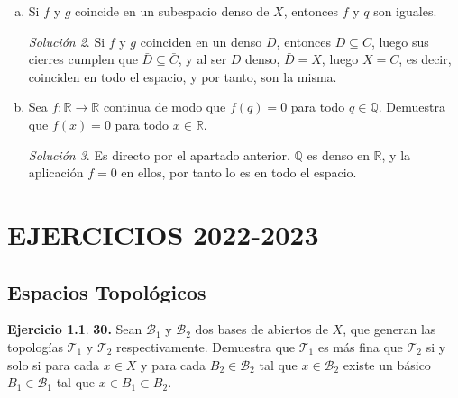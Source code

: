 \documentclass[12pt,twoside]{report}
\newcommand\mc[1]{\mathcal{#1}}
\theoremstyle{azul}
\theoremstyle{azul2}
\theoremstyle{plain}
\theoremstyle{definition}
\newtheorem*{ejer}{Ejercicio}
\theoremstyle{remark}
\newtheorem*{sol}{Solución}
\begin{document}
\begin{enumerate}
\begin{enumerate}[a)]
\begin{sol}
    Supongamos que existe $z \in f^{-1}(U) \cap g^{-1}(V) \cap C$, en cuyo caso, $f(z) \in U, g(z) \in V$ y $f(z)=g(z)$, lo cual es una contradicción por la hipótesis de que $U \cap V = \emptyset$. Por tanto $X-C$ es abierto. 
    \end{sol}
    \item Si $f$ y $g$ coincide en un subespacio denso de $X$, entonces $f$ y $q$ son iguales.
    \begin{sol}
    Si $f$ y $g$ coinciden en un denso $D$, entonces $D \subseteq C$, luego sus cierres cumplen que $\bar{D} \subseteq \bar{C}$, y al ser $D$ denso, $\bar{D}=X$, luego $X=C$, es decir, coinciden en todo el espacio, y por tanto, son la misma.     \end{sol}
    \item Sea $f : \mathbb{R} \longrightarrow \mathbb{R}$ continua de modo que $f(q)=0$ para todo $q \in \mathbb{Q}$. Demuestra que $f(x)=0$ para todo $x \in \mathbb{R}$.
    \begin{sol}
    Es directo por el apartado anterior. $\mathbb{Q}$ es denso en $\mathbb{R}$, y la aplicación $f=0$ en ellos, por tanto lo es en todo el espacio.
    \end{sol}
\end{enumerate}
\end{enumerate}



\chapter{EJERCICIOS 2022-2023}
\section{Espacios Topológicos}
\begin{ejer} \textbf{30.} Sean $\mc{B}_1$ y $\mc{B}_2$ dos bases de abiertos de $X$, que generan las topologías $\mc{T}_1$ y $\mc{T}_2$ respectivamente. Demuestra que $\mc{T}_1$ es más fina que $\mc{T}_2$ si y solo si para cada $x \in X$ y para cada ${B}_2 \in \mc{B}_2$ tal que $x \in \mc{B}_2$ existe un básico $B_1\in \mc{B}_1$ tal que $x \in B_1 \subset B_2$.
\end{ejer}
\end{document}
